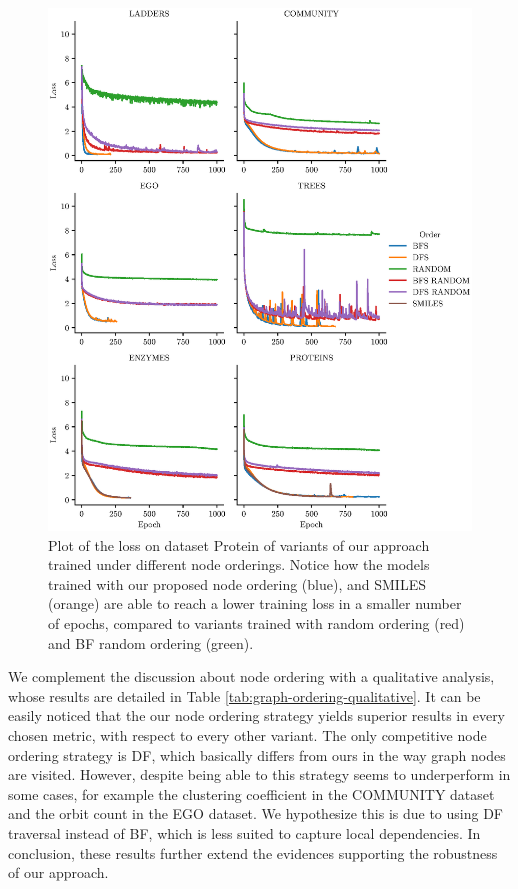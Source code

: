 \begin{figure}[h!]
\centering
\includegraphics[width=\textwidth]{Figures/Chapter6/loss.eps}
\caption{Plot of the loss on dataset Protein of variants of our approach trained under different node orderings. Notice how the models trained with our proposed node ordering (blue), and SMILES (orange) are able to reach a lower training loss in a smaller number of epochs, compared to variants trained with random ordering (red) and BF random ordering (green).}
\label{fig:loss}
\end{figure}
We complement the discussion about node ordering with a qualitative analysis, whose results are detailed in Table \ref{tab:graph-ordering-qualitative}. It can be easily noticed that the our node ordering strategy yields superior results in every chosen metric, with respect to every other variant. The only competitive node ordering strategy is DF, which basically differs from ours in the way graph nodes are visited. However, despite being able to this strategy seems to underperform in some cases, for example the clustering coefficient in the COMMUNITY dataset and the orbit count in the EGO dataset. We hypothesize this is due to using DF traversal instead of BF, which is less suited to capture local dependencies. In conclusion, these results further extend the evidences supporting the robustness of our approach.



